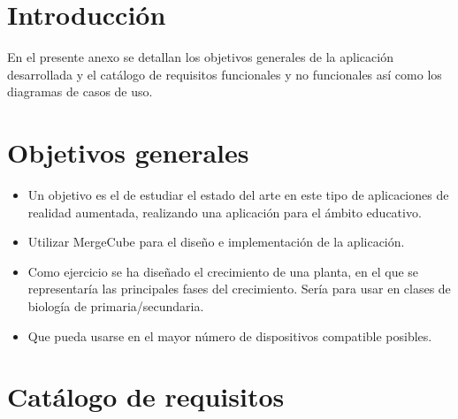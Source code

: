 
\section{Introducción}
En el presente anexo se detallan los objetivos generales de la aplicación desarrollada y el catálogo de requisitos funcionales y no funcionales así como los diagramas de casos de uso.
\section{Objetivos generales}
\begin{itemize}
	\item Un objetivo es el de estudiar el estado del arte en este tipo de aplicaciones de realidad aumentada, realizando una aplicación para el ámbito educativo.
	\item Utilizar MergeCube para el diseño e implementación de la aplicación.
	\item Como ejercicio se ha diseñado el crecimiento de una planta, en el que se representaría las principales fases del crecimiento. Sería para usar en clases de biología de primaria/secundaria.
	\item Que pueda usarse en el mayor número de dispositivos compatible posibles.
\end{itemize}
\section{Catálogo de requisitos}

